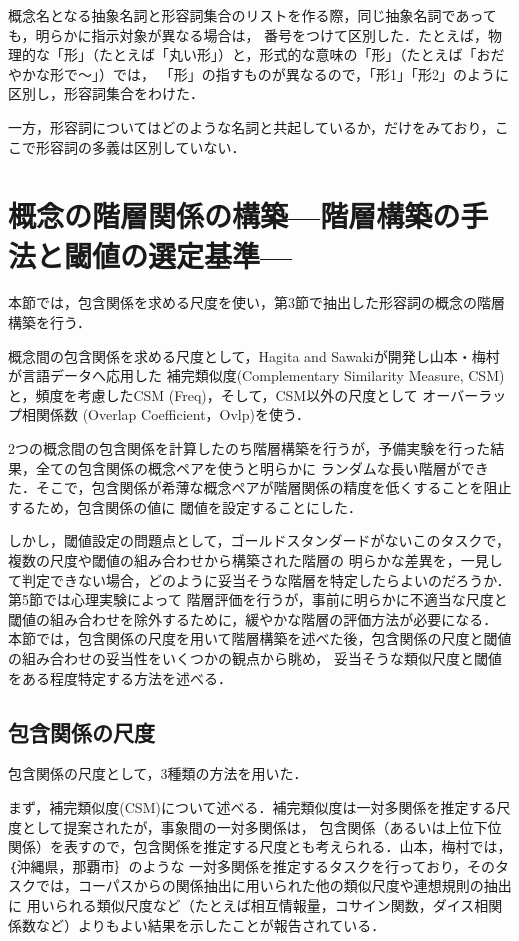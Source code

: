 \documentclass[japanese]{jnlp_1.4}
\begin{document}
概念名となる抽象名詞と形容詞集合のリストを作る際，同じ抽象名詞であっても，明らかに指示対象が異なる場合は，
番号をつけて区別した．たとえば，物理的な「形」（たとえば「丸い形」）と，形式的な意味の「形」（たとえば「おだやかな形で〜」）では，
「形」の指すものが異なるので，「形1」「形2」のように区別し，形容詞集合をわけた．

一方，形容詞についてはどのような名詞と共起しているか，だけをみており，ここで形容詞の多義は区別していない．



\section{概念の階層関係の構築—階層構築の手法と閾値の選定基準—}

本節では，包含関係を求める尺度を使い，第3節で抽出した形容詞の概念の階層構築を行う．

概念間の包含関係を求める尺度として，Hagita and Sawakiが開発し山本・梅村が言語データへ応用した
補完類似度(Complementary Similarity Measure, CSM)と，頻度を考慮したCSM (Freq)，そして，CSM以外の尺度として
オーバーラップ相関係数 (Overlap Coefficient，Ovlp)を使う\cite{Inproc_08,Article_37,Book_22}．

2つの概念間の包含関係を計算したのち階層構築を行うが，予備実験を行った結果，全ての包含関係の概念ペアを使うと明らかに
ランダムな長い階層ができた．そこで，包含関係が希薄な概念ペアが階層関係の精度を低くすることを阻止するため，包含関係の値に
閾値を設定することにした．

しかし，閾値設定の問題点として，ゴールドスタンダードがないこのタスクで，複数の尺度や閾値の組み合わせから構築された階層の
明らかな差異を，一見して判定できない場合，どのように妥当そうな階層を特定したらよいのだろうか．第5節では心理実験によって
階層評価を行うが，事前に明らかに不適当な尺度と閾値の組み合わせを除外するために，緩やかな階層の評価方法が必要になる．
本節では，包含関係の尺度を用いて階層構築を述べた後，包含関係の尺度と閾値の組み合わせの妥当性をいくつかの観点から眺め，
妥当そうな類似尺度と閾値をある程度特定する方法を述べる．


\subsection{包含関係の尺度}

包含関係の尺度として，3種類の方法を用いた．

まず，補完類似度(CSM)について述べる．補完類似度は一対多関係を推定する尺度として提案されたが，事象間の一対多関係は，
包含関係（あるいは上位下位関係）を表すので，包含関係を推定する尺度とも考えられる．山本，梅村では，｛沖縄県，那覇市｝のような
一対多関係を推定するタスクを行っており，そのタスクでは，コーパスからの関係抽出に用いられた他の類似尺度や連想規則の抽出に
用いられる類似尺度など（たとえば相互情報量，コサイン関数，ダイス相関係数など）よりもよい結果を示したことが報告されている\cite{Article_37}．
\end{document}
